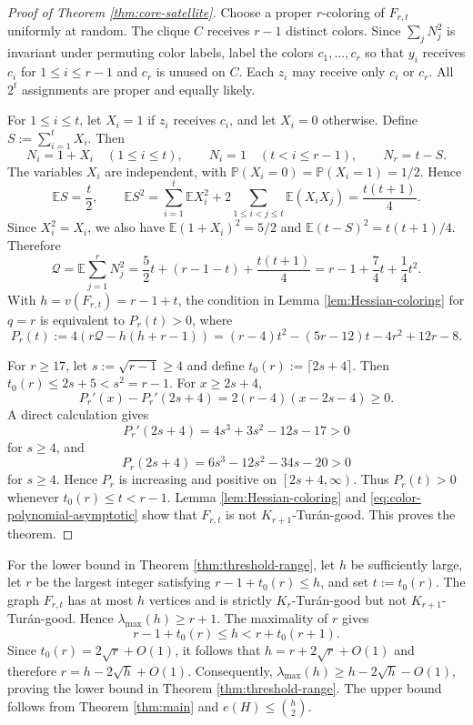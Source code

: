 \documentclass[11pt]{article}
\numberwithin{equation}{section}
\theoremstyle{definition}
\theoremstyle{remark}
\newcommand{\E}{\mathbb E}
\newcommand{\Prb}{\mathbb P}
\begin{document}
\begin{proof}[Proof of Theorem \ref{thm:core-satellite}]
Choose a proper $r$-coloring of $F_{r,t}$ uniformly at random. The clique $C$ receives $r-1$ distinct colors. Since $\sum_jN_j^2$ is invariant under permuting color labels, label the colors $c_1,\ldots,c_r$ so that $y_i$ receives $c_i$ for $1\le i\le r-1$ and $c_r$ is unused on $C$. Each $z_i$ may receive only $c_i$ or $c_r$. All $2^t$ assignments are proper and equally likely.

For $1\le i\le t$, let $X_i=1$ if $z_i$ receives $c_i$, and let $X_i=0$ otherwise. Define $S:=\sum_{i=1}^tX_i$. Then
\[
N_i=1+X_i\quad(1\le i\le t),
\qquad
N_i=1\quad(t<i\le r-1),
\qquad
N_r=t-S.
\]
The variables $X_i$ are independent, with $\Prb(X_i=0)=\Prb(X_i=1)=1/2$. Hence
\[
\E S=\frac t2,\qquad
\E S^2
=\sum_{i=1}^t\E X_i^2
+2\sum_{1\le i<j\le t}\E(X_iX_j)
=\frac{t(t+1)}4.
\]
Since $X_i^2=X_i$, we also have $\E(1+X_i)^2=5/2$ and $\E(t-S)^2=t(t+1)/4$. Therefore
\[
\mathcal Q=\E\sum_{j=1}^rN_j^2
=\frac52t+(r-1-t)+\frac{t(t+1)}4
=r-1+\frac74t+\frac14t^2.
\]
With $h=v(F_{r,t})=r-1+t$, the condition in Lemma \ref{lem:Hessian-coloring} for $q=r$ is equivalent to $P_r(t)>0$, where
\[
P_r(t):=4\left(r\mathcal Q-h(h+r-1)\right)
=(r-4)t^2-(5r-12)t-4r^2+12r-8.
\]

For $r\ge 17$, let $s:=\sqrt{r-1}\ge 4$ and define $t_0(r):=\lceil 2s+4\rceil$. Then $t_0(r)\le 2s+5<s^2=r-1$.
For $x\ge 2s+4$,
\[
P_r'(x)-P_r'(2s+4)=2(r-4)(x-2s-4)\ge 0.
\]
A direct calculation gives
\[
P_r'(2s+4)=4s^3+3s^2-12s-17>0
\]
for $s\ge 4$, and
\[
P_r(2s+4)=6s^3-12s^2-34s-20>0
\]
for $s\ge 4$. Hence $P_r$ is increasing and positive on $\left[2s+4,\infty\right)$. Thus $P_r(t)>0$ whenever $t_0(r)\le t<r-1$.
Lemma \ref{lem:Hessian-coloring} and \eqref{eq:color-polynomial-asymptotic} show that $F_{r,t}$ is not $K_{r+1}$-Tur\'an-good. This proves the theorem.
\end{proof}

For the lower bound in Theorem \ref{thm:threshold-range}, let $h$ be
sufficiently large, let $r$ be the largest integer satisfying
$r-1+t_0(r)\le h$, and set $t:=t_0(r)$. The graph $F_{r,t}$ has at
most $h$ vertices and is strictly $K_r$-Tur\'an-good but not
$K_{r+1}$-Tur\'an-good. Hence $\lambda_{\max}(h)\ge r+1$. The
maximality of $r$ gives
\[
r-1+t_0(r)\le h<r+t_0(r+1).
\]
Since $t_0(r)=2\sqrt r+O(1)$, it follows that
$h=r+2\sqrt r+O(1)$ and therefore $r=h-2\sqrt h+O(1)$. Consequently,
$\lambda_{\max}(h)\ge h-2\sqrt h-O(1)$, proving the lower bound in
Theorem \ref{thm:threshold-range}. The upper bound follows from
Theorem \ref{thm:main} and $e(H)\le \binom h2$.
\end{document}
